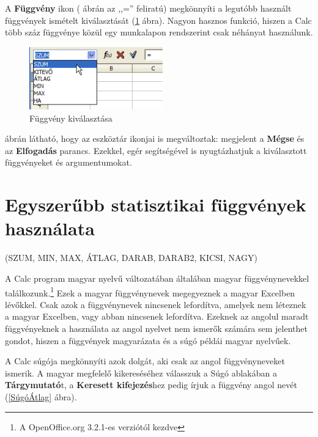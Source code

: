 A \textbf{Függvény} ikon ( ábrán az
,,='' feliratú) megkönnyíti a
legutóbb használt függvények ismételt kiválasztását
(\ref{FüggvényKiválasztás} ábra).
Nagyon hasznos funkció, hiszen a Calc több száz
függvénye közül egy munkalapon rendszerint csak néhányat
használunk. 

\begin{figure}[h]
\begin{center}
\includegraphics[width=5.772cm]{oocalcv2-img33.png}
\caption{Függvény kiválasztása}\label{FüggvényKiválasztás}
\end{center}
\end{figure}

 ábrán látható, hogy az eszköztár ikonjai is
megváltoztak: megjelent a \textbf{Mégse} és az
\textbf{Elfogadás} parancs. Ezekkel, egér segítségével is
nyugtázhatjuk a kiválasztott függvényeket és argumentumokat.

\section{Egyszerűbb statisztikai függvények használata}
(SZUM, MIN, MAX, ÁTLAG, DARAB, DARAB2, KICSI, NAGY)

A Calc program magyar nyelvű változatában általában magyar
függvénynevekkel találkozunk.\footnote{A OpenOffice.org 3.2.1-es 
verziótól kezdve} Ezek a magyar függvénynevek megegyeznek a magyar
Excelben lévőkkel. Csak azok a függvénynevek 
nincsenek lefordítva, amelyek nem léteznek a magyar Excelben, 
vagy abban nincsenek lefordítva. Ezeknek az angolul maradt 
függvényeknek a használata az angol
nyelvet nem ismerők számára sem jelenthet gondot, hiszen a
függvények magyarázata és a súgó példái magyar nyelvűek. 

A Calc súgója megkönnyíti azok dolgát, aki csak az angol függvényneveket
ismerik. A magyar megfelelő kikereséséhez válasszuk a Súgó
ablakában a \textbf{Tárgymutató}t, a \textbf{Keresett
kifejezés}hez pedig írjuk a függvény angol nevét
(\ref{SúgóÁtlag} ábra).


